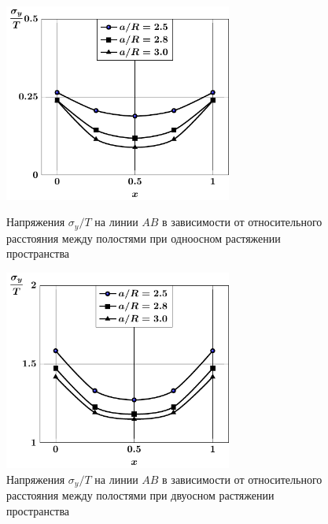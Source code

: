 \begin{figure}[h!]
\centering\footnotesize
\parbox[b]{7.5cm}{\centering\includegraphics[width=7.5cm]{cav4-a-d95-t1-sig_y.pdf}
\caption{Напряжения $\sigma_y/T$ на линии $AB$ в зависимости от относительного расстояния между полостями при одноосном растяжении пространства
\label{f:8:103}}}\hfil\hfil
\parbox[b]{7.5cm}{\centering\includegraphics[width=7.5cm]{cav4-a-d95-t2-sig_y.pdf}
\caption{Напряжения $\sigma_y/T$ на линии $AB$ в зависимости от относительного расстояния между полостями при двуосном растяжении пространства
\label{f:8:104}}}
\end{figure}

